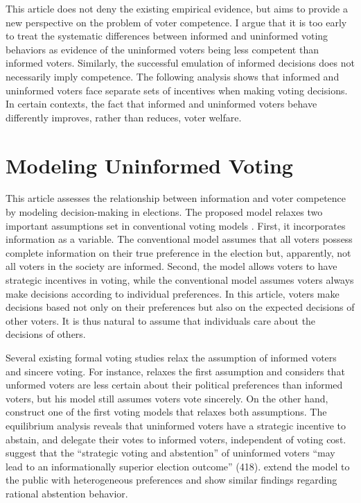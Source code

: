 \documentclass[doc,natbib,12pt]{apa6}
\begin{document}
	\par This article does not deny the existing empirical evidence, but aims to provide a new perspective on the problem of voter competence. I argue that it is too early to treat the systematic differences between informed and uninformed voting behaviors as evidence of the uninformed voters being less competent than informed voters. Similarly, the successful emulation of informed decisions does not necessarily imply competence. The following analysis shows that informed and uninformed voters face separate sets of incentives when making voting decisions. In certain contexts, the fact that informed and uninformed voters behave differently improves, rather than reduces, voter welfare. 
	
	\section{Modeling Uninformed Voting}
	
	\par This article assesses the relationship between information and voter competence by modeling decision-making in elections. The proposed model relaxes two important assumptions set in conventional voting models \citep{Downs1957anec, Riker1968thof}. First, it incorporates information as a variable. The conventional model assumes that all voters possess complete information on their true preference in the election but, apparently, not all voters in the society are informed. Second, the model allows voters to have strategic incentives in voting, while the conventional model assumes voters always make decisions according to individual preferences. In this article, voters make decisions based not only on their preferences but also on the expected decisions of other voters. It is thus natural to assume that individuals care about the decisions of others. 
	
	\par Several existing formal voting studies relax the assumption of informed voters and sincere voting. For instance, \cite{Matsusaka1995exvo} relaxes the first assumption and considers that unformed voters are less certain about their political preferences than informed voters, but his model still assumes voters vote sincerely. On the other hand, \cite{Feddersen1996thsw} construct one of the first voting models that relaxes both assumptions. The equilibrium analysis reveals that uninformed voters have a strategic incentive to abstain, and delegate their votes to informed voters, independent of voting cost. \citeauthor{Feddersen1996thsw} suggest that the ``strategic voting and abstention'' of uninformed voters ``may lead to an informationally superior election outcome'' (418). \cite{Feddersen1999abin} extend the model to the public with heterogeneous preferences and show similar findings regarding rational abstention behavior.
	
\end{document}
